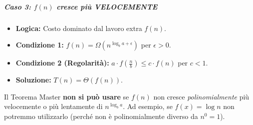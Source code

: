 \begin{example}[Guida Passo-Passo: $T(n) = 9 \cdot T(\frac{n}{3}) + n$]
    \subparagraph{Caso 3: $f(n)$ cresce più VELOCEMENTE}
    \begin{itemize}
        \item \textbf{Logica:} Costo dominato dal lavoro extra $f(n)$.
        \item \textbf{Condizione 1:} $f(n) = \Omega(n^{\log_b{a} + \epsilon})$ per $\epsilon > 0$.
        \item \textbf{Condizione 2 (Regolarità):} $a \cdot f(\frac{n}{b}) \leq c \cdot f(n)$ per $c < 1$.
        \item \textbf{Soluzione:} $T(n) = \Theta(f(n))$.
    \end{itemize}
\end{example}

\begin{observation}
Il Teorema Master \textbf{non si può usare} se $f(n)$ non cresce \emph{polinomialmente} più velocemente o più lentamente di $n^{\log_b{a}}$.
Ad esempio, se $f(x) = \log{n}$ non potremmo utilizzarlo (perché non è polinomialmente diverso da $n^0=1$).
\end{observation}

\newpage